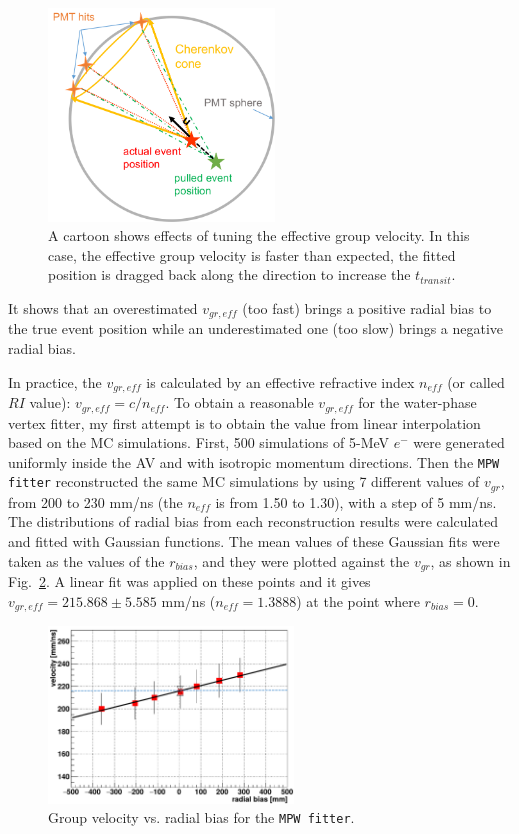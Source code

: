 \begin{figure}[!htb]
	\centering
	\includegraphics[width=6cm]{effectOfGroupVelocity.png}
	\caption[A cartoon shows effects of tuning the effective group velocity.]{A cartoon shows effects of tuning the effective group velocity. In this case, the effective group velocity is faster than expected, the fitted position is dragged back along the direction to increase the $t_{transit}$.	\label{fig:effectiveVg}}
\end{figure}
It shows that an overestimated $v_{gr,eff}$ (too fast) brings a positive radial bias to the true event position while an underestimated one (too slow) brings a negative radial bias.

In practice, the $v_{gr,eff}$ is calculated by an effective refractive index $n_{eff}$ (or called $RI$ value): $v_{gr,eff}=c/n_{eff}$. To obtain a reasonable $v_{gr,eff}$ for the water-phase vertex fitter, my first attempt is to obtain the value from linear interpolation based on the MC simulations. First, 500 simulations of 5-MeV $e^-$ were generated uniformly inside the AV and with isotropic momentum directions. Then the \texttt{MPW fitter} reconstructed the same MC simulations by using 7 different values of $v_{gr}$, from 200 to 230 mm/ns (the $n_{eff}$ is from 1.50 to 1.30), with a step of 5 mm/ns. The distributions of radial bias from each reconstruction results were calculated and fitted with Gaussian functions. The mean values of these Gaussian fits were taken as the values of the $r_{bias}$, and they were plotted against the $v_{gr}$, as shown in Fig.~\ref{fig:plotVgr}. A linear fit was applied on these points and it gives $v_{gr,eff}=215.868\pm 5.585$ mm/ns ($n_{eff}=1.3888$) at the point where $r_{bias}=0$.

\begin{figure}[!htb]
	\centering
	\includegraphics[width=6.5cm]{tune_groupVelocity_MPW.png}
	\caption[Group velocity vs. radial bias for the \texttt{MPW fitter}.]{Group velocity vs. radial bias for the \texttt{MPW fitter}.	\label{fig:plotVgr}}
\end{figure}

